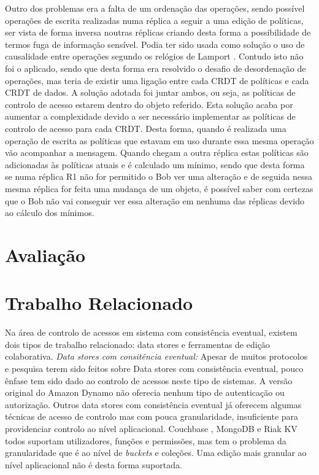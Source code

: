 \documentclass[runningheads,a4paper]{llncs}
\begin{document}
Outro dos problemas era a falta de um ordenação das operações, sendo possível operações de escrita realizadas numa réplica a seguir a uma edição de políticas, ser vista de forma inversa noutras réplicas criando desta forma a possibilidade de termos fuga de informação sensível. Podia ter sido usada como solução o uso de causalidade entre operações segundo os relógios de Lamport \cite{lamport1978time}. Contudo isto não foi o aplicado, sendo que desta forma era resolvido o desafio de desordenação de operações, mas teria de existir uma ligação entre cada CRDT de políticas e cada CRDT de dados. A solução adotada foi juntar ambos, ou seja, as políticas de controlo de acesso estarem dentro do objeto referido. Esta solução acaba por aumentar a complexidade devido a ser necessário implementar as políticas de controlo de acesso para cada CRDT. Desta forma, quando é realizada uma operação de escrita as políticas que estavam em uso durante essa mesma operação vão acompanhar a mensagem. Quando chegam a outra réplica estas políticas são adicionadas às políticas atuais e é calculado um mínimo, sendo que desta forma se numa réplica R1 não for permitido o Bob ver uma alteração e de seguida nessa mesma réplica for feita uma mudança de um objeto, é possível saber com certezas que o Bob não vai conseguir ver essa alteração em nenhuma das réplicas devido ao cálculo dos mínimos.

\section{Avaliação}\label{sec:av}

\section{Trabalho Relacionado}\label{sec:related work}

Na área de controlo de acessos em sistema com consistência eventual, existem dois tipos de trabalho relacionado: data stores e ferramentas de edição colaborativa.
\textit{Data stores com consitência eventual:} Apesar de muitos protocolos e pesquisa terem sido feitos sobre Data stores com consistência eventual, pouco ênfase tem sido dado ao controlo de acessos neste tipo de sistemas. A versão original do Amazon Dynamo \cite{decandia2007dynamo} não oferecia nenhum tipo de autenticação ou autorização. Outros data stores com consistência eventual já oferecem algumas técnicas de acesso de controlo mas com pouca granularidade, insuficiente para providenciar controlo ao nível aplicacional. Couchbase \cite{couch}, MongoDB \cite{mongo} e Riak KV \cite{riak} todos suportam utilizadores, funções e permissões, mas tem o problema da granularidade que é ao nível de \textit{buckets} e coleções. Uma edição mais granular ao nível aplicacional não é desta forma suportada.
\end{document}
